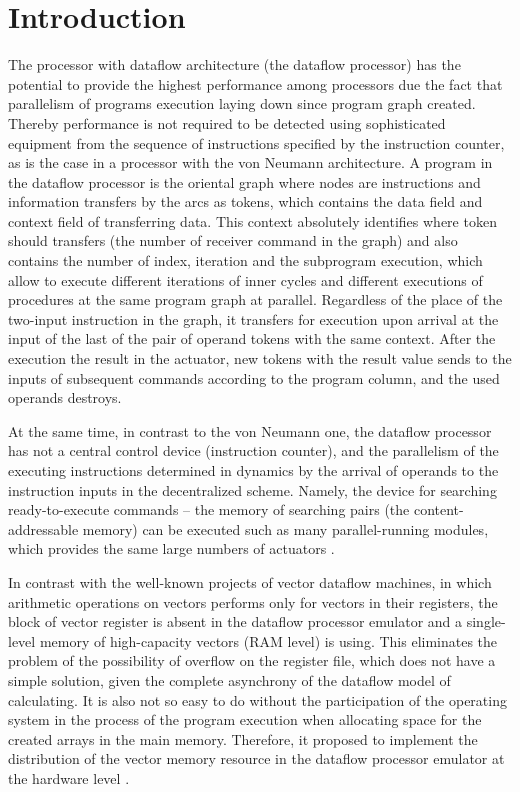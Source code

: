 \documentclass[
11pt,%
tightenlines,%
twoside,%
onecolumn,%
nofloats,%
nobibnotes,%
nofootinbib,%
superscriptaddress,%
noshowpacs,%
centertags]%
{revtex4}
\begin{document}
\section{Introduction}

The processor with dataflow architecture (the dataflow processor) has the potential to provide the highest performance among processors due the fact that parallelism of programs execution laying down since program graph created. Thereby performance is not required to be detected using sophisticated equipment from the sequence of instructions specified by the instruction counter, as is the case in a processor with the von Neumann architecture. A program in the dataflow processor is the oriental graph where nodes are instructions and information transfers by the arcs as tokens, which contains the data field and context field of transferring data. This context absolutely identifies where token should transfers (the number of receiver command in the graph) and also contains the number of index, iteration and the subprogram execution, which allow to execute different iterations of inner cycles and different executions of procedures at the same program graph at parallel. Regardless of the place of the two-input instruction in the graph, it transfers for execution upon arrival at the input of the last of the pair of operand tokens with the same context. After the execution the result in the actuator, new tokens with the result value sends to the inputs of subsequent commands according to the program column, and the used operands destroys.

At the same time, in contrast to the von Neumann one, the dataflow processor has not a central control device (instruction counter), and the parallelism of the executing instructions determined in dynamics by the arrival of operands to the instruction inputs in the decentralized scheme. Namely, the device for searching ready-to-execute commands -- the memory of searching pairs (the content-addressable memory) can be executed such as many parallel-running modules, which provides the same large numbers of actuators \cite{fine-grained-prl}.


In contrast with the well-known projects of vector dataflow machines, in which arithmetic operations on vectors performs only for vectors in their registers, the block of vector register is absent in the dataflow processor emulator and a single-level memory of high-capacity vectors (RAM level) is using. This eliminates the problem of the possibility of overflow on the register file, which does not have a simple solution, given the complete asynchrony of the dataflow model of calculating. It is also not so easy to do without the participation of the operating system in the process of the program execution when allocating space for the created arrays in the main memory. Therefore, it proposed to implement the distribution of the vector memory resource in the dataflow processor emulator at the hardware level \cite{vpp}.
\end{document}
